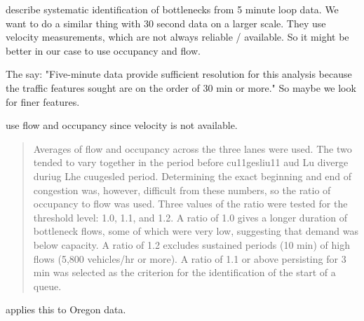 \documentclass[12pt]{article}
\begin{document}
\cite{chen2004systematic} describe systematic identification of bottlenecks from 5
minute loop data. We want to do a similar thing with 30 second data on a larger scale.
They use velocity measurements, which are not always reliable / available. So it might be 
better in our case to use occupancy and flow.

The say: "Five-minute data provide sufficient
resolution for this analysis because the traffic features sought are on
the order of 30 min or more." So maybe we look for finer features.

\cite{hall1991freeway} use flow and occupancy since velocity is not available.

\begin{quote}
Averages of flow and occupancy across the three lanes were
used. The two tended to vary together in the period before
cu11gesliu11 aud Lu diverge duriug Lhe cuugesled period. Determining
the exact beginning and end of congestion was,
however, difficult from these numbers, so the ratio of occupancy
to flow was used. Three values of the ratio were tested
for the threshold level: 1.0, 1.1, and 1.2. A ratio of 1.0 gives
a longer duration of bottleneck flows, some of which were
very low, suggesting that demand was below capacity. A ratio
of 1.2 excludes sustained periods (10 min) of high flows (5,800
vehicles/hr or more). A ratio of 1.1 or above persisting for 3
min was selected as the criterion for the identification of the
start of a queue. 
\end{quote}

\cite{wieczorek2010techniques} applies this to Oregon data.

 


\end{document}

